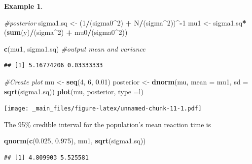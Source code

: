 \documentclass[
]{book}
\newenvironment{Shaded}{\begin{snugshade}}{\end{snugshade}}
\newcommand{\AttributeTok}[1]{\textcolor[rgb]{0.13,0.29,0.53}{#1}}
\newcommand{\CommentTok}[1]{\textcolor[rgb]{0.56,0.35,0.01}{\textit{#1}}}
\newcommand{\DecValTok}[1]{\textcolor[rgb]{0.00,0.00,0.81}{#1}}
\newcommand{\FloatTok}[1]{\textcolor[rgb]{0.00,0.00,0.81}{#1}}
\newcommand{\FunctionTok}[1]{\textcolor[rgb]{0.13,0.29,0.53}{\textbf{#1}}}
\newcommand{\NormalTok}[1]{#1}
\newcommand{\OtherTok}[1]{\textcolor[rgb]{0.56,0.35,0.01}{#1}}
\newcommand{\SpecialCharTok}[1]{\textcolor[rgb]{0.81,0.36,0.00}{\textbf{#1}}}
\newcommand{\StringTok}[1]{\textcolor[rgb]{0.31,0.60,0.02}{#1}}
\theoremstyle{definition}
\theoremstyle{definition}
\newtheorem{example}{Example}[chapter]
\theoremstyle{definition}
\theoremstyle{definition}
\theoremstyle{remark}
\begin{document}
\begin{example}
\begin{Shaded}
\begin{Highlighting}[]
\CommentTok{\#posterior}
\NormalTok{sigma1.sq }\OtherTok{\textless{}{-}}\NormalTok{ (}\DecValTok{1}\SpecialCharTok{/}\NormalTok{(sigma0}\SpecialCharTok{\^{}}\DecValTok{2}\NormalTok{)  }\SpecialCharTok{+}\NormalTok{ N}\SpecialCharTok{/}\NormalTok{(sigma}\SpecialCharTok{\^{}}\DecValTok{2}\NormalTok{))}\SpecialCharTok{\^{}{-}}\DecValTok{1}
\NormalTok{mu1       }\OtherTok{\textless{}{-}}\NormalTok{ sigma1.sq}\SpecialCharTok{*}\NormalTok{(}\FunctionTok{sum}\NormalTok{(y)}\SpecialCharTok{/}\NormalTok{(sigma}\SpecialCharTok{\^{}}\DecValTok{2}\NormalTok{) }\SpecialCharTok{+}\NormalTok{ mu0}\SpecialCharTok{/}\NormalTok{(sigma0}\SpecialCharTok{\^{}}\DecValTok{2}\NormalTok{))}

\FunctionTok{c}\NormalTok{(mu1, sigma1.sq) }\CommentTok{\#output mean and variance}
\end{Highlighting}
\end{Shaded}

\begin{verbatim}
## [1] 5.16774206 0.03333333
\end{verbatim}

\begin{Shaded}
\begin{Highlighting}[]
\CommentTok{\#Create plot}
\NormalTok{mu }\OtherTok{\textless{}{-}} \FunctionTok{seq}\NormalTok{(}\DecValTok{4}\NormalTok{, }\DecValTok{6}\NormalTok{, }\FloatTok{0.01}\NormalTok{)}
\NormalTok{posterior }\OtherTok{\textless{}{-}} \FunctionTok{dnorm}\NormalTok{(mu, }\AttributeTok{mean =}\NormalTok{ mu1, }\AttributeTok{sd =} \FunctionTok{sqrt}\NormalTok{(sigma1.sq))}
\FunctionTok{plot}\NormalTok{(mu, posterior, }\AttributeTok{type =}\StringTok{\textquotesingle{}l\textquotesingle{}}\NormalTok{)}
\end{Highlighting}
\end{Shaded}

\texttt{[image: \_main\_files/figure-latex/unnamed-chunk-11-1.pdf]}

The 95\% credible interval for the population's mean reaction time is

\begin{Shaded}
\begin{Highlighting}[]
\FunctionTok{qnorm}\NormalTok{(}\FunctionTok{c}\NormalTok{(}\FloatTok{0.025}\NormalTok{, }\FloatTok{0.975}\NormalTok{), mu1, }\FunctionTok{sqrt}\NormalTok{(sigma1.sq))}
\end{Highlighting}
\end{Shaded}

\begin{verbatim}
## [1] 4.809903 5.525581
\end{verbatim}

\end{example}
\end{document}
